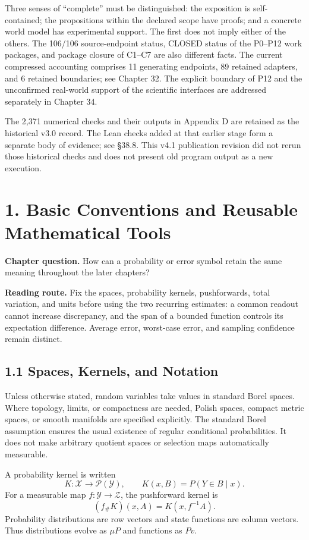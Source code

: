 \documentclass[
  english,
  11pt,
  oneside]{book}
\begin{document}
Three senses of ``complete'' must be distinguished: the exposition is self-contained; the propositions within the declared scope have proofs; and a concrete world model has experimental support. The first does not imply either of the others. The 106/106 source-endpoint status, CLOSED status of the P0--P12 work packages, and package closure of C1--C7 are also different facts. The current compressed accounting comprises 11 generating endpoints, 89 retained adapters, and 6 retained boundaries; see Chapter 32. The explicit boundary of P12 and the unconfirmed real-world support of the scientific interfaces are addressed separately in Chapter 34.

The 2,371 numerical checks and their outputs in Appendix D are retained as the historical v3.0 record. The Lean checks added at that earlier stage form a separate body of evidence; see §38.8. This v4.1 publication revision did not rerun those historical checks and does not present old program output as a new execution.

\chapter{1. Basic Conventions and Reusable Mathematical Tools}\label{ch-1}

\textbf{Chapter question.} How can a probability or error symbol retain the same meaning throughout the later chapters?

\textbf{Reading route.} Fix the spaces, probability kernels, pushforwards, total variation, and units before using the two recurring estimates: a common readout cannot increase discrepancy, and the span of a bounded function controls its expectation difference. Average error, worst-case error, and sampling confidence remain distinct.

\section{1.1 Spaces, Kernels, and Notation}\label{spaces-kernels-and-notation}

Unless otherwise stated, random variables take values in standard Borel spaces. Where topology, limits, or compactness are needed, Polish spaces, compact metric spaces, or smooth manifolds are specified explicitly. The standard Borel assumption ensures the usual existence of regular conditional probabilities. It does not make arbitrary quotient spaces or selection maps automatically measurable.

A probability kernel is written \[K:\mathcal X\longrightarrow\mathcal P(\mathcal Y),\qquad
K(x,B)=P(Y\in B\mid x).\] For a measurable map \(f:\mathcal Y\to\mathcal Z\), the pushforward kernel is \[(f_\#K)(x,A)=K(x,f^{-1}A).\] Probability distributions are row vectors and state functions are column vectors. Thus distributions evolve as \(\mu P\) and functions as \(Pv\).
\end{document}
